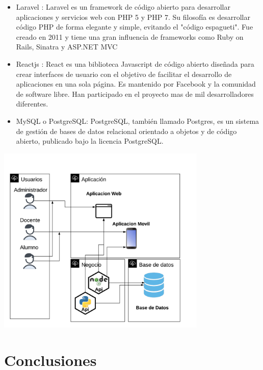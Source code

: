 \documentclass[%
 reprint,
 amsmath,amssymb,
 aps,
]{revtex4-1}
\begin{document}
\begin{itemize}
\item Laravel :
Laravel es un framework de código abierto para desarrollar aplicaciones y servicios web con PHP 5 y PHP 7. Su filosofía es desarrollar código PHP de forma elegante y simple, evitando el "código espagueti". Fue creado en 2011 y tiene una gran influencia de frameworks como Ruby on Rails, Sinatra y ASP.NET MVC
\item Reactjs :
React es una biblioteca Javascript de código abierto diseñada para crear interfaces de usuario con el objetivo de facilitar el desarrollo de aplicaciones en una sola página. Es mantenido por Facebook y la comunidad de software libre. Han participado en el proyecto mas de mil desarrolladores diferentes.
\item MySQL o PostgreSQL:
PostgreSQL, también llamado Postgres, es un sistema de gestión de bases de datos relacional orientado a objetos y de código abierto, publicado bajo la licencia PostgreSQL.
\end{itemize}
\begin{center}
\includegraphics[width=10cm]{./Imagenes/arquitectura2}
\end{center}

\section{Conclusiones}
\end{document}

